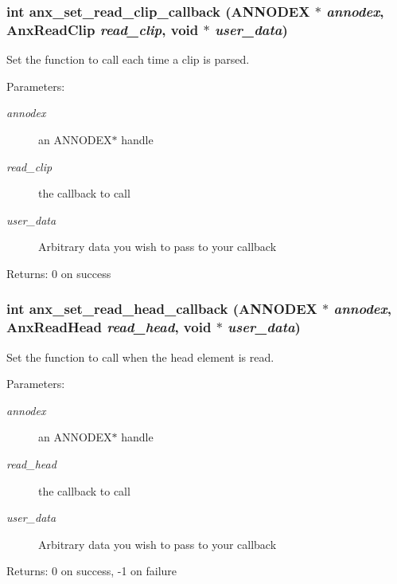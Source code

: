 \subsubsection{\setlength{\rightskip}{0pt plus 5cm}int anx\_\-set\_\-read\_\-clip\_\-callback ({\bf ANNODEX} $\ast$ {\em annodex}, {\bf Anx\-Read\-Clip} {\em read\_\-clip}, void $\ast$ {\em user\_\-data})}\label{anx__read_8h_a11}


Set the function to call each time a clip is parsed. 

\begin{Desc}
\item[Parameters:]
\begin{description}
\item[{\em annodex}]an ANNODEX$\ast$ handle \item[{\em read\_\-clip}]the callback to call \item[{\em user\_\-data}]Arbitrary data you wish to pass to your callback \end{description}
\end{Desc}
\begin{Desc}
\item[Returns:]0 on success \end{Desc}
\subsubsection{\setlength{\rightskip}{0pt plus 5cm}int anx\_\-set\_\-read\_\-head\_\-callback ({\bf ANNODEX} $\ast$ {\em annodex}, {\bf Anx\-Read\-Head} {\em read\_\-head}, void $\ast$ {\em user\_\-data})}\label{anx__read_8h_a9}


Set the function to call when the head element is read. 

\begin{Desc}
\item[Parameters:]
\begin{description}
\item[{\em annodex}]an ANNODEX$\ast$ handle \item[{\em read\_\-head}]the callback to call \item[{\em user\_\-data}]Arbitrary data you wish to pass to your callback \end{description}
\end{Desc}
\begin{Desc}
\item[Returns:]0 on success, -1 on failure \end{Desc}
